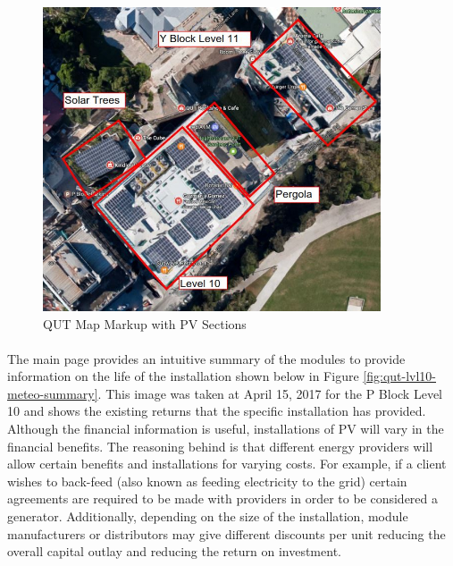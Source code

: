 \begin{figure}[H]
	\hfill\includegraphics[width=100mm]{images/metering/meteo/pblock-map}\hspace*{\fill}
	\caption{QUT Map Markup with PV Sections} 
	\label{fig:qut-map-pv-markup}
\end{figure}

\paragraph{}
The main page provides an intuitive summary of the modules to provide information on the life of the installation shown below in Figure \ref{fig:qut-lvl10-meteo-summary}. This image was taken at April 15, 2017 for the P Block Level 10 and shows the existing returns that the specific installation has provided. Although the financial information is useful, installations of PV will vary in the financial benefits. The reasoning behind is that different energy providers will allow certain benefits and installations for varying costs. For example, if a client wishes to back-feed (also known as feeding electricity to the grid) certain agreements are required to be made with providers in order to be considered a generator. Additionally, depending on the size of the installation, module manufacturers or distributors may give different discounts per unit reducing the overall capital outlay and reducing the return on investment.       

